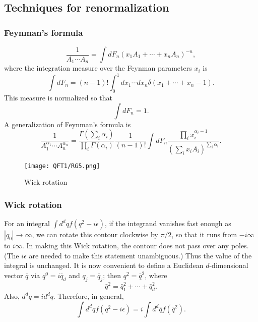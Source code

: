 \subsection{Techniques for renormalization}
\subsubsection{Feynman's formula}
\begin{newthem}
\[ \frac{1}{A_1 \cdots A_n} = \int dF_n (x_1A_1+ \cdots +x_nA_n)^{-n},\]
where the integration measure over the Feynman parameters $x_i$ is
\[\int dF_n = (n-1)! \int_0^1 dx_1 \cdots dx_n \delta(x_1+\cdots+x_n-1).\]
This measure is normalized so that
\[\int dF_n = 1.\]
A generalization of Feynman's formula is
\[ \frac{1}{A_1^{\alpha_1} \cdots A_n^{\alpha_n}} = \frac{\Gamma(\sum_i \alpha_i)}{\prod_i \Gamma(\alpha_i)} \frac{1}{(n-1)!}\int dF_n \frac{\prod_i x_i^{\alpha_i-1}}{(\sum_i x_i A_i)^{\sum_i \alpha_i}}.\]
\end{newthem}
\begin{figure}[!h]
\centering
\texttt{[image: QFT1/RG5.png]}
\caption{Wick rotation}
\end{figure}

\subsubsection{Wick rotation}
For an integral $\int d^d q f(q^2-i\epsilon)$, if the integrand vanishes fast enough as $|q_0| \to \infty$, we can rotate this contour clockwise by ${\pi}/{2}$, so that it runs from $-i\infty$ to $i\infty$. In making this Wick rotation, the contour does not pass over any poles. (The $i\epsilon$ are needed to make this statement unambiguous.) Thus the value of the integral is unchanged. It is now convenient to define a Euclidean $d$-dimensional vector $\bar{q}$ via $q^0 = i \bar{q}_d$ and $q_j = \bar{q}_j$; then $q^2 = \bar{q}^2$, where
\[\bar{q}^2 = \bar{q}_1^2 + \cdots + \bar{q}_d^2.\]
Also, $d^dq = id^d \bar{q}$. Therefore, in general,
\[\int d^d q f(q^2-i\epsilon) = i \int d^d\bar{q} f(\bar{q}^2).\]

